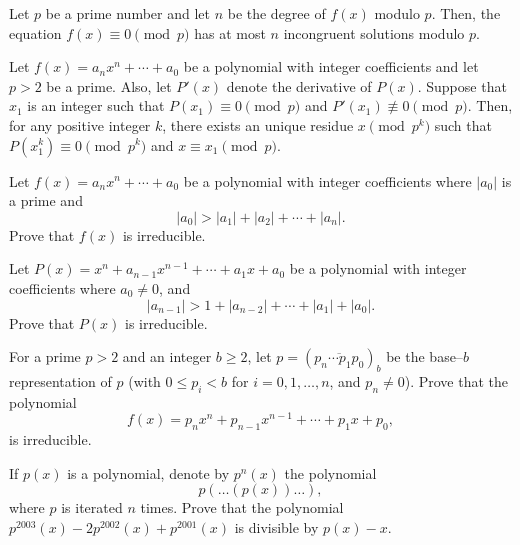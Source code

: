 \begin{theorem}
    Let $p$ be a prime number and let $n$ be the degree of $f(x)$ modulo $p$. Then, the equation $f(x) \equiv 0 \pmod p$ has at most $n$ incongruent solutions modulo $p$.
\end{theorem}

\begin{theorem}
  Let $f(x)=a_nx^n+\cdots+a_0$ be a polynomial with integer coefficients and let $p> 2$
be a prime. Also, let $P'(x)$ denote the derivative of $P(x)$. Suppose that $x_1$ is an integer such that $P(x_1)\equiv 0 \pmod{p}$ and $P'(x_1)\not \equiv 0 \pmod{p}$. Then, for any positive integer $k$, there exists an unique residue $x \pmod{p^k}$ such that $P(x_1^k)\equiv 0 \pmod{p^k}$ and $x  \equiv x_1 \pmod{p}$.
\end{theorem}

\begin{question}
    Let $f(x)=a_nx^n+\cdots+a_0$ be a polynomial with integer coefficients where $|a_0|$ is a prime and
    \[|a_0| > |a_1| + |a_2| + \cdots + |a_n|.\]
    Prove that $f(x)$ is irreducible.
\end{question}




\begin{question}[name={Perron's Criterion}]
    Let $P(x)=x^n+a_{n-1}x^{n-1}+\cdots+a_1x+a_0$ be a polynomial with integer coefficients where $a_0 \neq 0$, and
    \[|a_{n-1}| > 1 + |a_{n-2}| +  \cdots + |a_1| + |a_0|.\]
    Prove that $P(x)$ is irreducible.
\end{question}



\begin{question}[name={Cohn's Criterion}]
    For a prime $p>2$ and an integer $b \geq 2$, let $p=(\overline{p_n\cdots p_1p_0})_b$ be the base--$b$ representation of $p$ (with $0 \leq p_i < b$ for $i=0,1,\dots,n$, and $p_n\neq 0$). Prove that the polynomial
    \[f(x)=p_nx^n+p_{n-1}x^{n-1}+\cdots+p_1x+p_0,\]
    is irreducible.
\end{question}


\begin{question}[name={2003 Serbia TST}]
    If $p(x)$ is a polynomial, denote by $p^n(x)$ the polynomial \[p(\dots(p(x))\dots),\] where $p$ is iterated $n$ times. Prove that the polynomial $p^{2003}(x)-2p^{2002}(x)+p^{2001}(x)$ is divisible by $ p(x)-x$.
\end{question}



